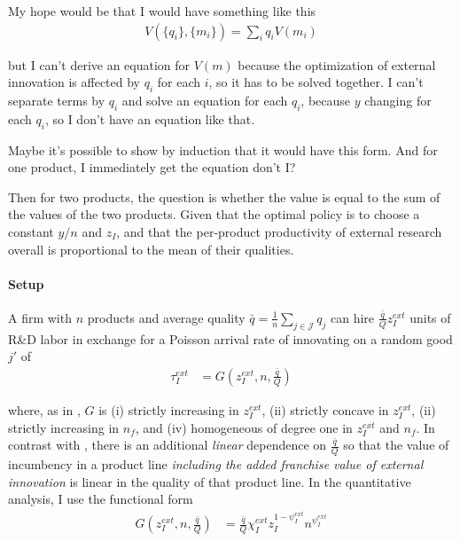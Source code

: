 \documentclass[12pt,english]{article}
\theoremstyle{remark}
\begin{document}
My hope would be that I would have something like this 
\begin{align*}
	V(\{q_i\},\{m_i\}) = \sum_i q_i V(m_i)
\end{align*}

but I can't derive an equation for $V(m)$ because the optimization of external innovation is affected by $q_i$ for each $i$, so it has to be solved together. I can't separate terms by $q_i$ and solve an equation for each $q_i$, because $y$ changing for each $q_i$, so I don't have an equation like that. 

Maybe it's possible to show by induction that it would have this form. And for one product, I immediately get the equation don't I? 

Then for two products, the question is whether the value is equal to the sum of the values of the two products. Given that the optimal policy is to choose a constant $y/n$ and $z_I$, and that the per-product productivity of external research overall is proportional to the mean of their qualities.



\paragraph{Setup}

A firm with $n$ products and average quality $\bar{q} = \frac{1}{n}\sum_{j \in \mathcal{J}} q_{j}$ can hire $\frac{\bar{q}}{Q} z_I^{ext}$ units of R\&D labor in exchange for a Poisson arrival rate of innovating on a random good $j'$ of 
\begin{align}
	\tau_I^{ext} &= G(z_I^{ext},n,\frac{\bar{q}}{Q})
\end{align}

where, as in \cite{klette_innovating_2004}, $G$ is (i) strictly increasing in $z_I^{ext}$, (ii) strictly concave in $z_I^{ext}$, (ii) strictly increasing in $n_f$, and (iv) homogeneous of degree one in $z_I^{ext}$ and $n_f$. In contrast with \cite{klette_innovating_2004}, there is an additional \textit{linear} dependence on $\frac{\bar{q}}{Q}$ so that the value of incumbency in a product line \textit{including the added franchise value of external innovation} is linear in the quality of that product line. In the quantitative analysis, I use the functional form 
\begin{align}
	G(z_I^{ext},n,\frac{\bar{q}}{Q}) &= \frac{\bar{q}}{Q} \chi_I^{ext} z_I^{1-\psi_I^{ext}} n^{\psi_I^{ext}} 
\end{align}
\end{document}
